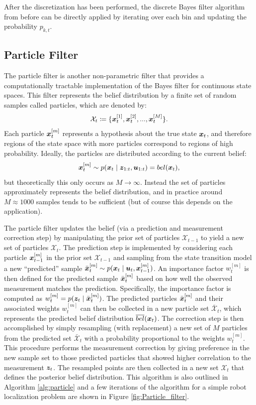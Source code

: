 After the discretization has been performed, the discrete Bayes filter algorithm from before can be directly applied by iterating over each bin and updating the probability $p_{k,t}$.

\subsection{Particle Filter}
The particle filter is another non-parametric filter that provides a computationally tractable implementation of the Bayes filter for continuous state spaces. This filter represents the belief distribution by a finite set of random samples called particles, which are denoted by:
\begin{equation}
\mathcal{X}_t \coloneqq \{\bm{x}_t^{[1]}, \bm{x}_t^{[2]},..., \bm{x}_t^{[M]}\}.
\end{equation}
Each particle $\bm{x}_t^{[m]}$ represents a hypothesis about the true state $\bm{x}_t$, and therefore regions of the state space with more particles correspond to regions of high probability.
Ideally, the particles are distributed according to the current belief:
\begin{equation}
    \bm{x}_t^{[m]} \sim p(\bm{x}_t \mid \bm{z}_{1:t}, \bm{u}_{1:t}) = bel(\bm{x}_t),
    \label{bel-posterior}
\end{equation}
but theoretically this only occurs as $M\rightarrow \infty$. Instead the set of particles approximately represents the belief distribution, and in practice around $M\approx 1000$ samples tends to be sufficient (but of course this depends on the application).

The particle filter updates the belief (via a prediction and measurement correction step) by manipulating the prior set of particles $\mathcal{X}_{t-1}$ to yield a new set of particles $\mathcal{X}_t$. The prediction step is implemented by considering each particle $\bm{x}_{t-1}^{[m]}$ in the prior set $\mathcal{X}_{t-1}$ and sampling from the state transition model a new ``predicted'' sample $\bar{\bm{x}}_{t}^{[m]} \sim p(\bm{x}_t \mid \bm{u}_t, \bm{x}_{t-1}^{[m]})$. An importance factor $w_{t}^{[m]}$ is then defined for the predicted sample $\bar{\bm{x}}_{t}^{[m]}$ based on how well the observed measurement matches the prediction. Specifically, the importance factor is computed as $w_t^{[m]} = p(\bm{z}_t \mid \bar{\bm{x}}_t^{[m]})$. The predicted particles $\bar{\bm{x}}_{t}^{[m]}$ and their associated weights $w_t^{[m]}$ can then be collected in a new particle set $\bar{\mathcal{X}}_t$, which represents the predicted belief distribution $\overline{bel}(\bm{x}_t)$.
The correction step is then accomplished by simply resampling (with replacement) a new set of $M$ particles from the predicted set $\bar{\mathcal{X}}_t$ with a probability proportional to the weights $w_t^{[m]}$. This procedure performs the measurement correction by giving preference in the new sample set to those predicted particles that showed higher correlation to the measurement $\bm{z}_t$.
The resampled points are then collected in a new set $\mathcal{X}_t$ that defines the posterior belief distribution.
This algorithm is also outlined in Algorithm \ref{alg:particle} and a few iterations of the algorithm for a simple robot localization problem are shown in Figure \ref{fig:Particle_filter}.

